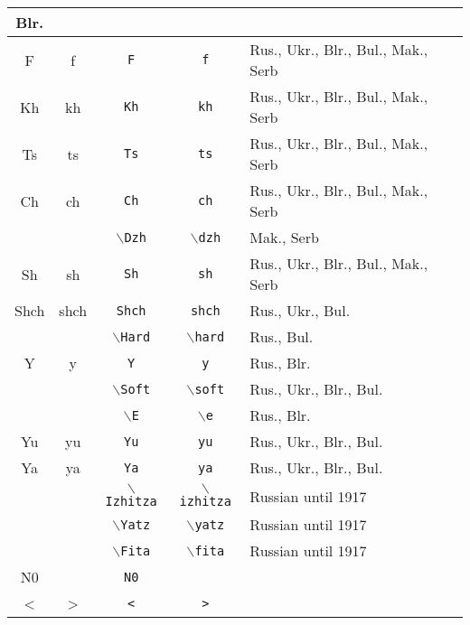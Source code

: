 \documentclass[a4paper]{article}
\def\cyr{\fontencoding{OT2}\fontfamily{wncyr}\selectfont}
\begin{document}
\begin{tabular}{|cc|cc|l|}
		Blr. \\
	\hline
	{\cyr F} & {\cyr f} & \texttt{F} & \texttt{f} &
		Rus., Ukr., Blr., Bul., Mak., Serb \\
	\hline
	{\cyr Kh} & {\cyr kh} & \texttt{Kh} & \texttt{kh} &
		Rus., Ukr., Blr., Bul., Mak., Serb \\
	\hline
	{\cyr Ts} & {\cyr ts} & \texttt{Ts} & \texttt{ts} &
		Rus., Ukr., Blr., Bul., Mak., Serb \\
	\hline
	{\cyr Ch} & {\cyr ch} & \texttt{Ch} & \texttt{ch} &
		Rus., Ukr., Blr., Bul., Mak., Serb \\
	\hline
	{\cyr \Dzh} & {\cyr \dzh} & \texttt{$\backslash$Dzh} &
		\texttt{$\backslash$dzh} &
		Mak., Serb \\
	\hline
	{\cyr Sh} & {\cyr sh} & \texttt{Sh} & \texttt{sh} &
		Rus., Ukr., Blr., Bul., Mak., Serb \\
	\hline
	{\cyr Shch} & {\cyr shch} & \texttt{Shch} & \texttt{shch} &
		Rus., Ukr., Bul. \\
	\hline
	{\cyr \Hard} & {\cyr \hard} & \texttt{$\backslash$Hard} &
		\texttt{$\backslash$hard} &
		Rus., Bul. \\
	\hline
	{\cyr Y} & {\cyr y} & \texttt{Y} & \texttt{y} &
		Rus., Blr. \\
	\hline
	{\cyr \Soft} & {\cyr \soft} & \texttt{$\backslash$Soft} &
		\texttt{$\backslash$soft} &
		Rus., Ukr., Blr., Bul. \\
	\hline
	{\cyr \E} & {\cyr \e} & \texttt{$\backslash$E} &
		\texttt{$\backslash$e} &
		Rus., Blr. \\
	\hline
	{\cyr Yu} & {\cyr yu} & \texttt{Yu} & \texttt{yu} &
		Rus., Ukr., Blr., Bul. \\
	\hline
	{\cyr Ya} & {\cyr ya} & \texttt{Ya} & \texttt{ya} &
		Rus., Ukr., Blr., Bul. \\
	\hline
	{\cyr \Izhitza} & {\cyr \izhitza} & \texttt{$\backslash$Izhitza} &
		\texttt{$\backslash$izhitza} & Russian until 1917 \\
	\hline
	{\cyr \Yatz} & {\cyr \yatz} & \texttt{$\backslash$Yatz} &
		\texttt{$\backslash$yatz} & Russian until 1917 \\
	\hline
	{\cyr \Fita} & {\cyr \fita} & \texttt{$\backslash$Fita} &
		\texttt{$\backslash$fita} &  Russian until 1917 \\
	\hline
	{\cyr N0} & & \texttt{N0} & & \\
	\hline
	{\cyr <} & {\cyr >} & \texttt{<} & \texttt{>} & \\
	\hline
\end{tabular}
\end{document}
